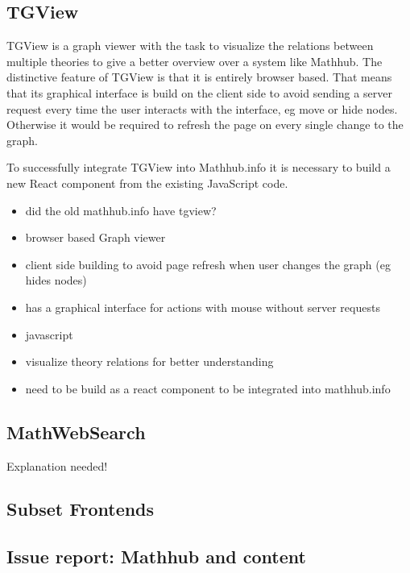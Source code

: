\documentclass[11pt,a4paper]{article}
\begin{document}
	\subsection{TGView} 
	TGView is a graph viewer with the task to visualize the relations between multiple theories to give a better overview over a system like Mathhub. 
	 The distinctive feature of TGView is that it is entirely browser based.
	 That means that its graphical interface is build on the client side to avoid sending a server request every time the user interacts with the interface, eg move or hide nodes.
	 Otherwise it would be required to refresh the page on every single change to the graph. 	\cite{tgview}
	 
	 To successfully integrate TGView into Mathhub.info it is necessary to build a new React component from the existing JavaScript code.
	 
	\begin{itemize}
	\item did the old mathhub.info have tgview?
	\item browser based Graph viewer
	\item client side building to avoid page refresh when user changes the graph (eg hides nodes)
	\item has a graphical interface for actions with mouse without server requests
	\item javascript
	\item visualize theory relations for better understanding
	\item need to be build as a react component to be integrated into mathhub.info
	\end{itemize}
	\subsection{MathWebSearch}
	Explanation needed!
	\subsection{Subset Frontends}
	\subsection{Issue report: Mathhub and content}

\printbibliography
{}
\end{document}
